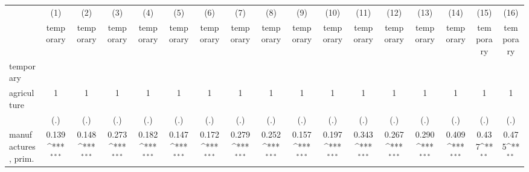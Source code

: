 {
\def\sym#1{\ifmmode^{#1}\else\(^{#1}\)\fi}
\begin{tabular}{l*{16}{c}}
\hline\hline
                    &\multicolumn{1}{c}{(1)}&\multicolumn{1}{c}{(2)}&\multicolumn{1}{c}{(3)}&\multicolumn{1}{c}{(4)}&\multicolumn{1}{c}{(5)}&\multicolumn{1}{c}{(6)}&\multicolumn{1}{c}{(7)}&\multicolumn{1}{c}{(8)}&\multicolumn{1}{c}{(9)}&\multicolumn{1}{c}{(10)}&\multicolumn{1}{c}{(11)}&\multicolumn{1}{c}{(12)}&\multicolumn{1}{c}{(13)}&\multicolumn{1}{c}{(14)}&\multicolumn{1}{c}{(15)}&\multicolumn{1}{c}{(16)}\\
                    &\multicolumn{1}{c}{temporary}&\multicolumn{1}{c}{temporary}&\multicolumn{1}{c}{temporary}&\multicolumn{1}{c}{temporary}&\multicolumn{1}{c}{temporary}&\multicolumn{1}{c}{temporary}&\multicolumn{1}{c}{temporary}&\multicolumn{1}{c}{temporary}&\multicolumn{1}{c}{temporary}&\multicolumn{1}{c}{temporary}&\multicolumn{1}{c}{temporary}&\multicolumn{1}{c}{temporary}&\multicolumn{1}{c}{temporary}&\multicolumn{1}{c}{temporary}&\multicolumn{1}{c}{temporary}&\multicolumn{1}{c}{temporary}\\
\hline
temporary           &                     &                     &                     &                     &                     &                     &                     &                     &                     &                     &                     &                     &                     &                     &                     &                     \\
agriculture         &           1         &           1         &           1         &           1         &           1         &           1         &           1         &           1         &           1         &           1         &           1         &           1         &           1         &           1         &           1         &           1         \\
                    &         (.)         &         (.)         &         (.)         &         (.)         &         (.)         &         (.)         &         (.)         &         (.)         &         (.)         &         (.)         &         (.)         &         (.)         &         (.)         &         (.)         &         (.)         &         (.)         \\
[1em]
manufactures, prim. &       0.139\sym{***}&       0.148\sym{***}&       0.273\sym{***}&       0.182\sym{***}&       0.147\sym{***}&       0.172\sym{***}&       0.279\sym{***}&       0.252\sym{***}&       0.157\sym{***}&       0.197\sym{***}&       0.343\sym{***}&       0.267\sym{***}&       0.290\sym{***}&       0.409\sym{***}&       0.437\sym{**} &       0.475\sym{**} \\

\end{tabular}}
